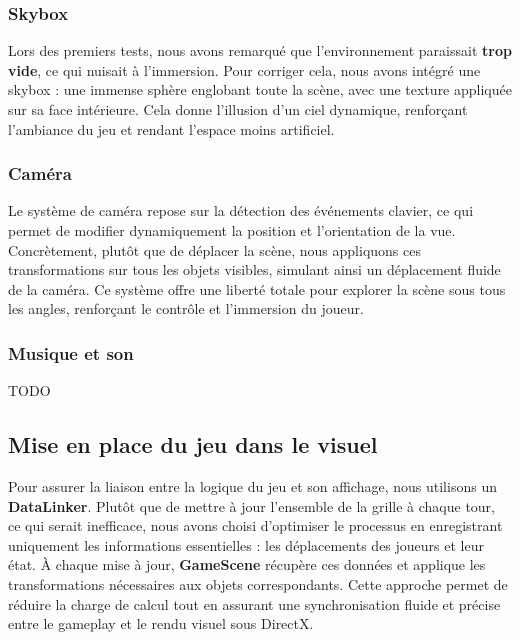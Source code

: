 \subsubsection{Skybox}
Lors des premiers tests, nous avons remarqué que l’environnement paraissait \textbf{trop vide}, ce qui nuisait à l’immersion. Pour corriger cela, nous avons intégré une skybox : une immense sphère englobant toute la scène, avec une texture appliquée sur sa face intérieure. Cela donne l’illusion d’un ciel dynamique, renforçant l’ambiance du jeu et rendant l’espace moins artificiel.
\subsubsection{Caméra}
Le système de caméra repose sur la détection des événements clavier, ce qui permet de modifier dynamiquement la position et l’orientation de la vue. Concrètement, plutôt que de déplacer la scène, nous appliquons ces transformations sur tous les objets visibles, simulant ainsi un déplacement fluide de la caméra. Ce système offre une liberté totale pour explorer la scène sous tous les angles, renforçant le contrôle et l’immersion du joueur.
\subsubsection{Musique et son}
TODO

\subsection{Mise en place du jeu dans le visuel}
Pour assurer la liaison entre la logique du jeu et son affichage, nous utilisons un \textbf{DataLinker}. Plutôt que de mettre à jour l’ensemble de la grille à chaque tour, ce qui serait inefficace, nous avons choisi d’optimiser le processus en enregistrant uniquement les informations essentielles : les déplacements des joueurs et leur état. À chaque mise à jour, \textbf{GameScene} récupère ces données et applique les transformations nécessaires aux objets correspondants. Cette approche permet de réduire la charge de calcul tout en assurant une synchronisation fluide et précise entre le gameplay et le rendu visuel sous DirectX.

